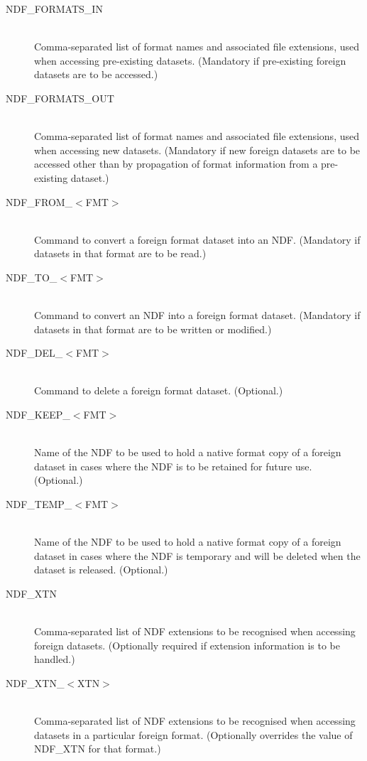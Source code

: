 \begin{description}

\item[NDF\_FORMATS\_IN]\mbox{}\\
Comma-separated list of format names and associated file extensions,
used when accessing pre-existing datasets. (Mandatory if pre-existing
foreign datasets are to be accessed.)

\item[NDF\_FORMATS\_OUT]\mbox{}\\
Comma-separated list of format names and associated file extensions,
used when accessing new datasets. (Mandatory if new foreign datasets
are to be accessed other than by propagation of format information
from a pre-existing dataset.)

\item[NDF\_FROM\_$<$FMT$>$]\mbox{}\\
Command to convert a foreign format dataset into an NDF. (Mandatory if
datasets in that format are to be read.)

\item[NDF\_TO\_$<$FMT$>$]\mbox{}\\
Command to convert an NDF into a foreign format dataset. (Mandatory if
datasets in that format are to be written or modified.)

\item[NDF\_DEL\_$<$FMT$>$]\mbox{}\\
Command to delete a foreign format dataset. (Optional.)

\item[NDF\_KEEP\_$<$FMT$>$]\mbox{}\\
Name of the NDF to be used to hold a native format copy of a foreign
dataset in cases where the NDF is to be retained for future
use. (Optional.)

\item[NDF\_TEMP\_$<$FMT$>$]\mbox{}\\
Name of the NDF to be used to hold a native format copy of a foreign
dataset in cases where the NDF is temporary and will be deleted when
the dataset is released. (Optional.)

\item[NDF\_XTN]\mbox{}\\
Comma-separated list of NDF extensions to be recognised when accessing
foreign datasets. (Optionally required if extension information is to
be handled.)

\item[NDF\_XTN\_$<$XTN$>$]\mbox{}\\
Comma-separated list of NDF extensions to be recognised when accessing
datasets in a particular foreign format. (Optionally overrides the
value of NDF\_XTN for that format.)


\end{description}
